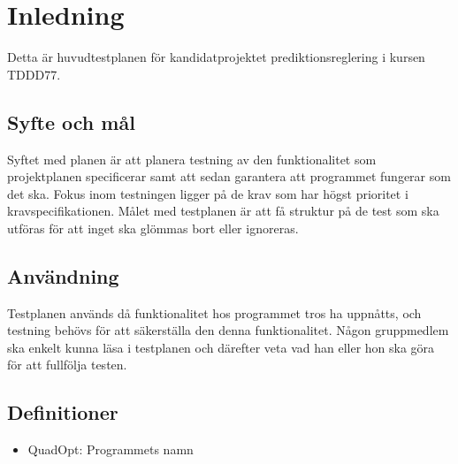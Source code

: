 \section{Inledning}
Detta är huvudtestplanen för kandidatprojektet prediktionsreglering i kursen TDDD77.

\subsection{Syfte och mål}
Syftet med planen är att planera testning av den funktionalitet som projektplanen specificerar samt att sedan garantera att programmet fungerar som det ska. Fokus inom testningen ligger på de krav som har högst prioritet i kravspecifikationen.
Målet med testplanen är att få struktur på de test som ska utföras för att inget ska glömmas bort eller ignoreras.

\subsection{Användning}
Testplanen används då funktionalitet hos programmet tros ha uppnåtts, och testning behövs för att säkerställa den denna funktionalitet. Någon gruppmedlem ska enkelt kunna läsa i testplanen och därefter veta vad han eller hon ska göra för att fullfölja testen.

\subsection{Definitioner}

\begin{itemize}
	\item{QuadOpt: Programmets namn}
\end{itemize}
